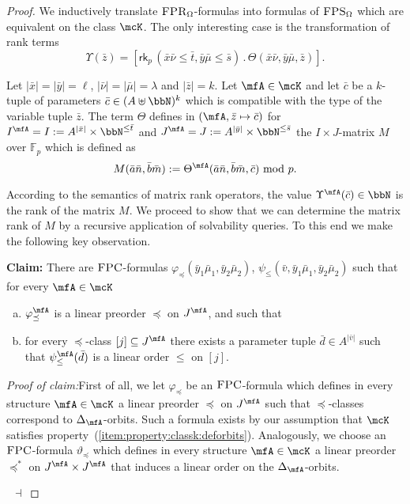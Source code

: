 \documentclass[a4paper,UKenglish]{lipics}
\newcommand{\defeq}{:=}
\newcommand{\card}[1]{\ensuremath{|#1|}}
\newcommand{\modulo}{\ensuremath{\text{mod }}}
\newcommand{\field}[1]{\mathbb{#1}}
\newcommand{\N}{\ensuremath{\bbN}}
\newcommand{\logic}[1]{\ensuremath{\textsc{#1}}\xspace}
\newcommand{\FPC}{\logic{FPC}}
\newcommand{\FPSx}[1]{\ensuremath{\logic{FPS}_{#1}}\xspace}
\newcommand{\FPRx}[1]{\ensuremath{\logic{FPR}_{#1}}\xspace}
\newcommand{\rkp}{\ensuremath{\textsf{rk}_p}\xspace}
\renewcommand{\phi}{\varphi}
\newcommand{\ba}{{\bar a}}
\newcommand{\bb}{{\bar b}}
\newcommand{\bc}{{\bar c}}
\newcommand{\bd}{{\bar d}}
\newcommand{\bm}{{\bar m}}
\newcommand{\bn}{{\bar n}}
\newcommand{\bv}{{\bar v}}
\newcommand{\bx}{{\bar x}}
\newcommand{\by}{{\bar y}}
\newcommand{\bz}{{\bar z}}
\newcommand{\bmu}{{\bar \mu}}
\newcommand{\bnu}{{\bar \nu}}
\theoremstyle{plain}
\newenvironment{claim}[1]{\par\noindent\textbf{Claim:}\space 
{#1}}{}
\newenvironment{claimproof}[1]{\par\noindent\textit{Proof of 
claim:}\space#1}
{\leavevmode\unskip\penalty9999 \hbox{}\nobreak\hfill\quad\hbox{
$\dashv$}}
\begin{document}
\begin{proof}
 We inductively translate $\FPRx{\Omega}$-formulas into formulas of 
$\FPSx{\Omega}$ which 
are equivalent on the class $\mcK$. The only interesting case is 
the transformation of rank terms
\[ \Upsilon(\bz) = [ \rkp \,(\bx\bnu\leq \bar t ,\by\bmu \leq \bar s) \, . 
\, \Theta(\bx\bnu, \by\bmu, \bz) ]. \]

Let $\card \bx = \card \by = \ell$, $\card \bnu = \card \bmu = \lambda$ 
and 
$\card \bz = k$. Let $\mfA \in \mcK$ and let $\bc$ be a $k$-tuple of 
parameters $\bc \in (A \uplus \N )^k$ which 
is compatible with the type of the variable tuple $\bz$. 
The term $\Theta$ defines in $(\mfA, \bz \mapsto \bc)$ 
for $I^{\mfA} = I \defeq A^{\card \bx} \times \N^{\leq \bar t}$ and 
$J^{\mfA} = J \defeq A^{\card \by} \times \N^{\leq \bar s}$
the $I \times J$-matrix $M$ over $\field F_p$ which is defined as
\[ M(\ba\bn, \bb\bm) \defeq \Theta^\mfA(\ba\bn,\bb\bm,\bc) \,\,\modulo p.\]

According to the semantics of matrix rank operators, the 
value $\Upsilon^\mfA(\bc) \in \N$ is the rank of the matrix $M$.
We proceed to show that we can determine the matrix rank of $M$ by a 
recursive application of solvability queries. To this end we make the 
following key observation.

\medskip
\begin{claim}
 There are $\FPC$-formulas $\phi_\preceq(\by_1\bmu_1,\by_2\bmu_2)$, 
$\psi_\leq(\bv,\by_1\bmu_1,\by_2\bmu_2)$ such that for every 
$\mfA \in \mcK$
\begin{enumerate}[(a)]
 \item $\phi_\preceq^\mfA$ is a linear preorder $\preceq$ on 
$J^\mfA$, and such that
 \item for every $\preceq$-class $[j] \subseteq J^\mfA$ there exists a 
parameter tuple $\bd \in A^{\card \bv}$ such that $\psi_\leq^\mfA(\bd)$ is 
a linear order $\leq$ on $[j]$.
\end{enumerate}
\end{claim}
\begin{claimproof}
 First of all, we let $\phi_\preceq$ be an \FPC-formula which defines in 
every structure $\mfA \in \mcK$ a linear preorder $\preceq$ on $J^\mfA$ 
such that $\preceq$-classes correspond to $\Delta_\mfA$-orbits. Such a 
formula exists by our assumption that $\mcK$ satisfies 
property~(\ref{item:property:classk:deforbits}).
Analogously, we choose an $\FPC$-formula $\vartheta_\preceq$ which defines 
in every structure $\mfA \in \mcK$ a linear preorder $\preceq^*$ on 
$J^\mfA \times J^\mfA$ that induces a linear order on the 
$\Delta_\mfA$-orbits.


\end{claimproof}
\end{proof}
\end{document}
